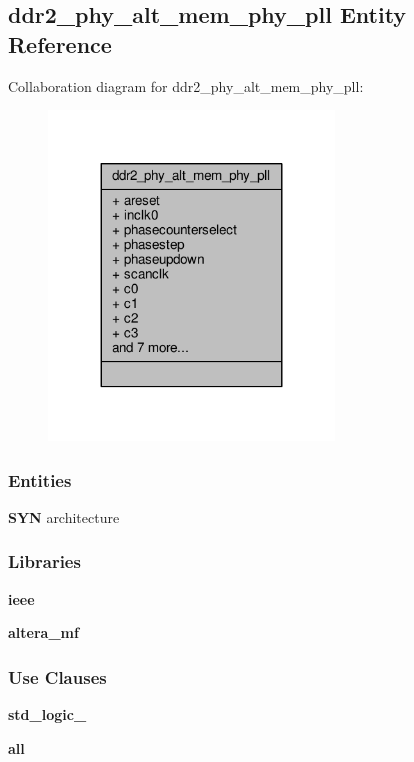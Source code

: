 \subsection{ddr2\+\_\+phy\+\_\+alt\+\_\+mem\+\_\+phy\+\_\+pll Entity Reference}
\label{classddr2__phy__alt__mem__phy__pll}


Collaboration diagram for ddr2\+\_\+phy\+\_\+alt\+\_\+mem\+\_\+phy\+\_\+pll\+:\nopagebreak
\begin{figure}[H]
\begin{center}
\leavevmode
\includegraphics[width=215pt]{d2/d32/classddr2__phy__alt__mem__phy__pll__coll__graph}
\end{center}
\end{figure}
\subsubsection*{Entities}
\begin{DoxyCompactItemize}
\item 
{\bf S\+YN} architecture
\end{DoxyCompactItemize}
\subsubsection*{Libraries}
 \begin{DoxyCompactItemize}
\item 
{\bf ieee} 
\item 
{\bf altera\+\_\+mf} 
\end{DoxyCompactItemize}
\subsubsection*{Use Clauses}
 \begin{DoxyCompactItemize}
\item 
{\bf std\+\_\+logic\+\_}   
\item 
{\bf  all }   
\end{DoxyCompactItemize}

